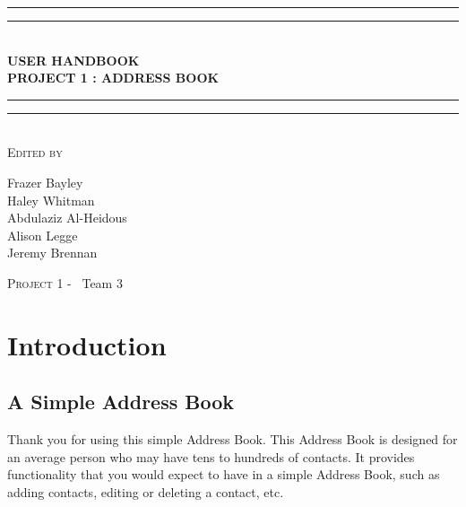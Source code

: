 \documentclass[a4paper, 11pt]{article}
\newlength{\drop}
\begin{document}
    
    
    \begin{titlepage}
        \textheight
        \centering
        \vspace*{\baselineskip}
        \rule{\textwidth}{1.6pt}\vspace*{-\baselineskip}\vspace*{2pt}
        \rule{\textwidth}{0.4pt}\\[\baselineskip]
        {\LARGE \textbf{USER HANDBOOK \\ PROJECT 1 : ADDRESS BOOK}}\\[0.2\baselineskip]
        \rule{\textwidth}{0.4pt}\vspace*{-\baselineskip}\vspace{3.2pt}
        \rule{\textwidth}{1.6pt}\\[\baselineskip]
        \scshape
        \vspace*{2\baselineskip}
        Edited by \\[\baselineskip]
        {\Large Frazer Bayley \\ Haley Whitman \\ Abdulaziz Al-Heidous \\ Alison Legge \\ Jeremy Brennan\par}

        \vfill
        {\scshape \LARGE Project 1 -} \        {\LARGE Team 3}\par
    \end{titlepage}


\tableofcontents
\vspace*{25\baselineskip}
\begin{versionhistory}
\end{versionhistory}
\pagebreak


\section{Introduction}
\subsection{A Simple Address Book}
Thank you for using this simple Address Book. This Address Book is designed for an average person who may have tens to hundreds of contacts. It provides functionality that you would expect to have in a simple Address Book, such as adding contacts, editing or deleting a contact, etc. 
\end{document}
